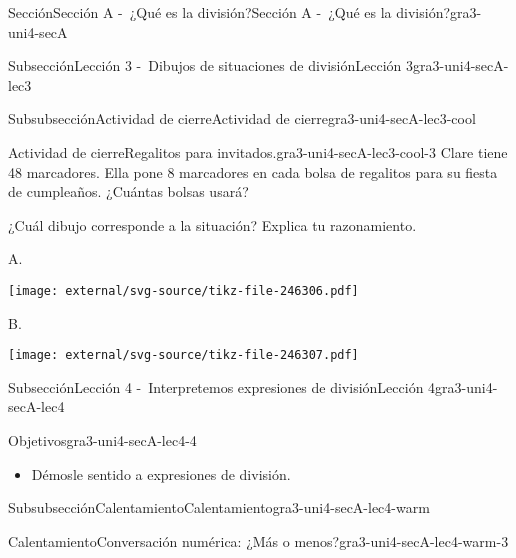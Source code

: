 \documentclass[twoside,14pt,]{extarticle}
\begin{document}
\begin{sectionptx}{Sección}{Sección A -~¿Qué es la división?}{}{Sección A -~¿Qué es la división?}{}{}{gra3-uni4-secA}
\begin{subsectionptx}{Subsección}{Lección 3 -~Dibujos de situaciones de división}{}{Lección 3}{}{}{gra3-uni4-secA-lec3}
\typeout{************************************************}
%
\begin{subsubsectionptx}{Subsubsección}{Actividad de cierre}{}{Actividad de cierre}{}{}{gra3-uni4-secA-lec3-cool}
\begin{project}{Actividad de cierre}{Regalitos para invitados.}{gra3-uni4-secA-lec3-cool-3}%
Clare tiene 48 marcadores. Ella pone 8 marcadores en cada bolsa de regalitos para su fiesta de cumpleaños. ¿Cuántas bolsas usará?%
\par
¿Cuál dibujo corresponde a la situación? Explica tu razonamiento.%
\begin{sidebyside}{2}{0}{0}{0}%
\begin{sbspanel}{0.5}%
A.%
\par
\texttt{[image: external/svg-source/tikz-file-246306.pdf]}
\end{sbspanel}%
\begin{sbspanel}{0.5}%
B.%
\par
\texttt{[image: external/svg-source/tikz-file-246307.pdf]}
\end{sbspanel}%
\end{sidebyside}%
\end{project}%
\end{subsubsectionptx}
\end{subsectionptx}
%
%
\typeout{************************************************}
\typeout{************************************************}
%
\begin{subsectionptx}{Subsección}{Lección 4 -~Interpretemos expresiones de división}{}{Lección 4}{}{}{gra3-uni4-secA-lec4}
\begin{objectives}{Objetivos}{gra3-uni4-secA-lec4-4}
%
\begin{itemize}[label=\textbullet]
\item{}Démosle sentido a expresiones de división.%
\end{itemize}
\end{objectives}
%
%
\typeout{************************************************}
\typeout{************************************************}
%
\begin{subsubsectionptx}{Subsubsección}{Calentamiento}{}{Calentamiento}{}{}{gra3-uni4-secA-lec4-warm}
\begin{exploration}{Calentamiento}{Conversación numérica: ¿Más o menos?}{gra3-uni4-secA-lec4-warm-3}%

\end{exploration}
\end{subsubsectionptx}
\end{subsectionptx}
\end{sectionptx}
\end{document}

